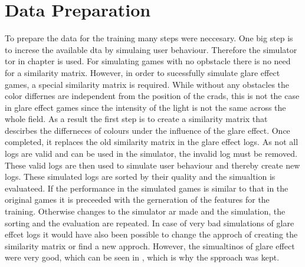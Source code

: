 \chapter{Data Preparation}
\label{data_preparation}
%	
%	
To prepare the data for the training many steps were neccesary. One big step is to increse the available dta by simulaing user behaviour. Therefore the simulator	tor in chapter  is used. For simulating games with no opbstacle there is no need for a similarity matrix. However, in order to sucessfully simulate glare effect games, a special similarity matrix is required. While without any obstacles the color differnes are independent from the position of the crads, this is not the case in glare effect games since the intensity of the light is not the same across the whole field. As a result the first step is to create a similarity matrix that descirbes the differneces of colours under the influence of the glare effect. Once completed, it replaces the old similarity matrix in the glare effect logs. As not all logs are valid and can be used in the simulator, the invalid log must be removed. These valid logs are then used to simulate user behaviour and thereby create new logs. These simulated logs are sorted by their quality and the simualtion is evaluateed. If the performance in the simulated games is similar to that in the original games it is preceeded with the gerneration of the features for the training. Otherwise changes to the simulator ar made and the simulation, the sorting and the evaluation are repeated. In case of very bad simulations of glare effcet logs it would have also been possible to change the approch of creating the similarity matrix or find a new approch. However, the simualtinos of glare effect were very good, which can be seen in , which is why the spproach was kept.


